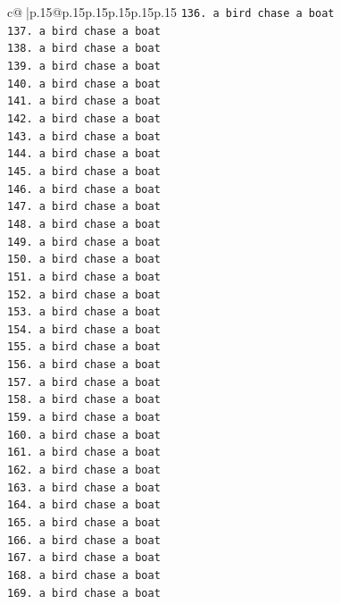 \documentclass{article}
\begin{document}
{\begin{supertabular}{c@{$\;$}|p{.15\linewidth}@{}p{.15\linewidth}p{.15\linewidth}p{.15\linewidth}p{.15\linewidth}p{.15\linewidth}}
{{{\texttt{136. a bird chase a boat} \\
\texttt{137. a bird chase a boat} \\
\texttt{138. a bird chase a boat} \\
\texttt{139. a bird chase a boat} \\
\texttt{140. a bird chase a boat} \\
\texttt{141. a bird chase a boat} \\
\texttt{142. a bird chase a boat} \\
\texttt{143. a bird chase a boat} \\
\texttt{144. a bird chase a boat} \\
\texttt{145. a bird chase a boat} \\
\texttt{146. a bird chase a boat} \\
\texttt{147. a bird chase a boat} \\
\texttt{148. a bird chase a boat} \\
\texttt{149. a bird chase a boat} \\
\texttt{150. a bird chase a boat} \\
\texttt{151. a bird chase a boat} \\
\texttt{152. a bird chase a boat} \\
\texttt{153. a bird chase a boat} \\
\texttt{154. a bird chase a boat} \\
\texttt{155. a bird chase a boat} \\
\texttt{156. a bird chase a boat} \\
\texttt{157. a bird chase a boat} \\
\texttt{158. a bird chase a boat} \\
\texttt{159. a bird chase a boat} \\
\texttt{160. a bird chase a boat} \\
\texttt{161. a bird chase a boat} \\
\texttt{162. a bird chase a boat} \\
\texttt{163. a bird chase a boat} \\
\texttt{164. a bird chase a boat} \\
\texttt{165. a bird chase a boat} \\
\texttt{166. a bird chase a boat} \\
\texttt{167. a bird chase a boat} \\
\texttt{168. a bird chase a boat} \\
\texttt{169. a bird chase a boat} \\
}}}
\end{supertabular}}
\end{document}

